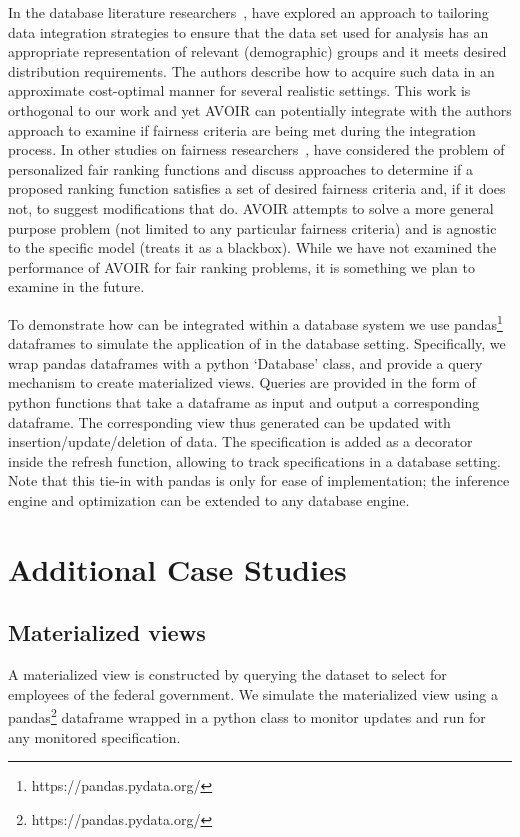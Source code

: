 In the database literature researchers~\cite{nargesian21tailoring}, have explored an approach to tailoring data integration strategies to ensure that the data set used for analysis has an appropriate representation of relevant (demographic) groups and it meets desired distribution requirements. The authors describe how to acquire such data in an approximate cost-optimal manner for several realistic settings. This work is orthogonal to our work and yet AVOIR can potentially integrate with the authors approach to examine if fairness criteria are being met during the integration process. In other studies on fairness researchers~\cite{yang2018nutritional,asudeh19a,asudeh19b}, have considered the problem of personalized fair ranking functions and discuss approaches to determine if a proposed ranking function satisfies a set of  desired fairness criteria and, if it does not, to suggest modifications that do. AVOIR attempts to solve a  more general purpose problem (not limited to any particular fairness criteria) and is agnostic to the specific model (treats it as a blackbox).  While we have not examined the performance of AVOIR for fair ranking problems, it is something we plan to examine in the future.

To demonstrate how \AVOIRmethodname{} can be integrated within a database system
we use pandas\footnote{https://pandas.pydata.org/} dataframes to simulate the application of \AVOIRmethodname{} in the database setting. 
Specifically, we wrap pandas dataframes with a python `Database' class, and provide a query mechanism to create materialized views.
Queries are provided in the form of python functions that take a dataframe as input and output a corresponding dataframe.
The corresponding view thus generated can be updated with insertion/update/deletion of data.
The specification is added as a decorator inside the refresh function, allowing \AVOIRmethodname{} to track specifications in a database setting.
Note that this tie-in with pandas is only for ease of implementation; the inference engine and optimization can be extended to any database engine.

\section{Additional Case Studies}
\label{sec:appendix:additional-case-studies}
\subsection{Materialized views}
\label{sec:appendix:additional-case-studies:materialized-view}
A materialized view is constructed by querying the dataset to select for employees of the federal government.
We simulate the materialized view using a pandas\footnote{https://pandas.pydata.org/} dataframe wrapped in a python class to monitor updates and run \AVOIRmethodname{} for any monitored specification.

